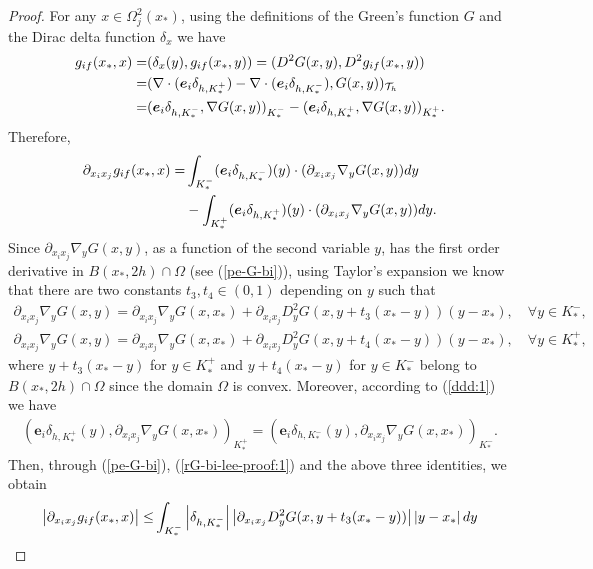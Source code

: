 \documentclass[10pt,a4paper]{amsart}
\begin{document}
\begin{proof}
For any $x\in \Omega_j^2(x_{\ast})$, using the definitions of the Green's function $G$ and the Dirac delta function $\delta_x$ we have
\begin{align}
g_{{\rm if}}(x_{\ast},x)=&(\delta_x(y),g_{{\rm if}}(x_{\ast},y))=(D^2G(x,y),D^2g_{{\rm if}}(x_{\ast},y))\nonumber\\
=&(\nabla\cdot({\bm e}_i\delta_{h,K^+_{\ast}})-\nabla\cdot({\bm e}_i\delta_{h,K^-_{\ast}}),G(x,y))_{\mathcal{T}_h}\nonumber\\
=&({\bm e}_i\delta_{h,K^-_{\ast}},\nabla G(x,y))_{K^-_{\ast}}-({\bm e}_i\delta_{h,K^+_{\ast}},\nabla G(x,y))_{K^+_{\ast}}.\nonumber
\end{align}
Therefore,
\begin{align}
\partial_{x_ix_j} g_{{\rm if}}(x_{\ast},x)=&\int_{K^-_{\ast}}({\bm e}_i\delta_{h,K^-_{\ast}})(y)\cdot(\partial_{x_ix_j}\nabla_y G(x,y)) dy\label{rG-bi-lee-proof:1}\\
&-\int_{K^+_{\ast}}({\bm e}_i\delta_{h,K^+_{\ast}})(y)\cdot(\partial_{x_ix_j}\nabla_y G(x,y)) dy.\nonumber
\end{align}
Since $\partial_{x_ix_j}\nabla_y G(x,y)$, as a function of the second variable $y$, has the first order derivative in $B(x_{\ast},2h)\cap\Omega$ (see (\ref{pe-G-bi})), using Taylor's expansion
we know that there are two constants $t_3,t_4\in (0,1)$ depending on $y$ such that
\begin{align*}
\partial_{x_ix_j}\nabla_y G(x,y)=\partial_{x_ix_j}\nabla_y G(x,x_{\ast})+\partial_{x_ix_j}D^2_y G(x,y+t_3(x_{\ast}-y))(y-x_{\ast}),\quad \forall y\in K_{\ast}^-,\\
\partial_{x_ix_j}\nabla_y G(x,y)=\partial_{x_ix_j}\nabla_y G(x,x_{\ast})+\partial_{x_ix_j}D^2_y G(x,y+t_4(x_{\ast}-y))(y-x_{\ast}),\quad \forall y\in K_{\ast}^+,
\end{align*}
where $y+t_3(x_{\ast}-y)$ for $y\in K_{\ast}^+$ and $y+t_4(x_{\ast}-y)$ for $y\in K_{\ast}^-$ belong to $B(x_{\ast},2h)\cap\Omega$ since the domain $\Omega$ is convex. Moreover, according to (\ref{ddd:1}) we have
\begin{align*}
({\bm e}_i\delta_{h,K_{\ast}^+}(y),\partial_{x_ix_j}\nabla_y G(x,x_{\ast}))_{K_{\ast}^+}=({\bm e}_i\delta_{h,K_{\ast}^-}(y),\partial_{x_ix_j}\nabla_y G(x,x_{\ast}))_{K_{\ast}^-}.
\end{align*}
 Then, through (\ref{pe-G-bi}), (\ref{rG-bi-lee-proof:1}) and the above three identities, we obtain
\begin{align*}
\left|\partial_{x_ix_j} g_{{\rm if}}(x_{\ast},x)\right|\leq&\int_{K^-_{\ast}}\left|\delta_{h,K^-_{\ast}}\right|\left|\partial_{x_ix_j}D^2_y G(x,y+t_3(x_{\ast}-y))\right|\left|y-x_{\ast}\right| dy\\

\end{align*}
\end{proof}
\end{document}
